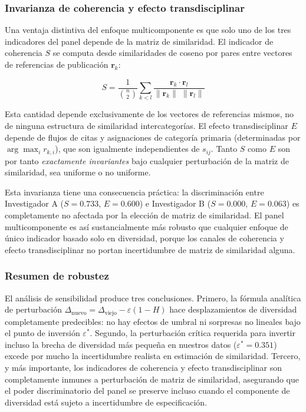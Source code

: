 \documentclass[
]{article}
\begin{document}
\hypertarget{invarianza-de-coherencia-y-efecto-transdisciplinar}{%
\subsubsection{Invarianza de coherencia y efecto
transdisciplinar}\label{invarianza-de-coherencia-y-efecto-transdisciplinar}}

Una ventaja distintiva del enfoque multicomponente es que solo uno de
los tres indicadores del panel depende de la matriz de similaridad. El
indicador de coherencia \(S\) se computa desde similaridades de coseno
por pares entre vectores de referencias de publicación \(\mathbf{r}_k\):

\[S = \frac{1}{\binom{n}{2}} \sum_{k < l}
  \frac{\mathbf{r}_k \cdot \mathbf{r}_l}
       {\|\mathbf{r}_k\|\;\|\mathbf{r}_l\|}\]

Esta cantidad depende exclusivamente de los vectores de referencias
mismos, no de ninguna estructura de similaridad intercategorías. El
efecto transdisciplinar \(E\) depende de flujos de citas y asignaciones
de categoría primaria (determinadas por \(\arg\max_i r_{k,i}\)), que son
igualmente independientes de \(s_{ij}\). Tanto \(S\) como \(E\) son por
tanto \emph{exactamente invariantes} bajo cualquier perturbación de la
matriz de similaridad, sea uniforme o no uniforme.

Esta invarianza tiene una consecuencia práctica: la discriminación entre
Investigador A (\(S = 0.733\), \(E = 0.600\)) e Investigador B
(\(S = 0.000\), \(E = 0.063\)) es completamente no afectada por la
elección de matriz de similaridad. El panel multicomponente es así
sustancialmente más robusto que cualquier enfoque de único indicador
basado solo en diversidad, porque los canales de coherencia y efecto
transdisciplinar no portan incertidumbre de matriz de similaridad
alguna.

\hypertarget{resumen-de-robustez}{%
\subsubsection{Resumen de robustez}\label{resumen-de-robustez}}

El análisis de sensibilidad produce tres conclusiones. Primero, la
fórmula analítica de perturbación
\(\Delta_{\text{nuevo}} = \Delta_{\text{viejo}} - \varepsilon(1-H)\)
hace desplazamientos de diversidad completamente predecibles: no hay
efectos de umbral ni sorpresas no lineales bajo el punto de inversión
\(\varepsilon^*\). Segundo, la perturbación crítica requerida para
invertir incluso la brecha de diversidad más pequeña en nuestros datos
(\(\varepsilon^* = 0.351\)) excede por mucho la incertidumbre realista
en estimación de similaridad. Tercero, y más importante, los indicadores
de coherencia y efecto transdisciplinar son completamente inmunes a
perturbación de matriz de similaridad, asegurando que el poder
discriminatorio del panel se preserve incluso cuando el componente de
diversidad está sujeto a incertidumbre de especificación.
\end{document}
